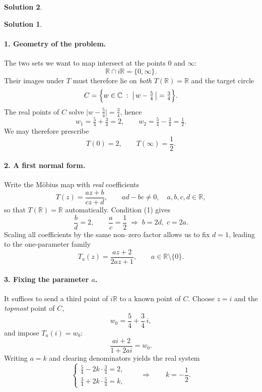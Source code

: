 \documentclass[12pt]{article}
\theoremstyle{definition} %
\newtheorem{solution}{Solution}
\theoremstyle{plain} %
\begin{document}
\begin{solution}
   \begin{solution}
      \paragraph{1.  Geometry of the problem.}
      The two sets we want to map intersect at the points $0$ and $\infty$:
      \[
         \mathbb{R}\cap i\mathbb{R}=\{0,\infty\}.
      \]
      Their images under $T$ must therefore lie on \emph{both}
      $T(\mathbb{R})=\mathbb{R}$ and the target circle
      \[
         C=\Bigl\{w\in\mathbb{C}\;:\;\bigl|\,w-\tfrac54\,\bigr|=\tfrac34\Bigr\}.
      \]
      The real points of $C$ solve 
      $\lvert w-\tfrac54\rvert=\tfrac34$, hence
      \[
         w_1=\tfrac54+\tfrac34=2,
         \qquad
         w_2=\tfrac54-\tfrac34=\tfrac12.
      \]
      We may therefore prescribe
      \[
         T(0)=2,
         \qquad
         T(\infty)=\frac12.
         \tag{1}
      \]
      
      \paragraph{2.  A first normal form.}
      Write the Möbius map with \emph{real} coefficients
      \[
         T(z)=\frac{az+b}{cz+d}, \qquad ad-bc\neq0,\quad a,b,c,d\in\mathbb{R},
      \]
      so that $T(\mathbb{R})=\mathbb{R}$ automatically.
      Condition (1) gives
      \[
         \frac{b}{d}=2,
         \qquad
         \frac{a}{c}=\frac12
         \;\Longrightarrow\;
         b=2d,\;c=2a.
      \]
      Scaling all coefficients by the same non–zero factor allows us to fix $d=1$, leading to the one-parameter family
      \[
         T_a(z)=\frac{az+2}{2az+1},
         \qquad a\in\mathbb{R}\setminus\{0\}.
         \tag{2}
      \]
      
      \paragraph{3.  Fixing the parameter \(a\).}
      It suffices to send a third point of $i\mathbb{R}$ to a known point of $C$.
      Choose $z=i$ and the \emph{topmost} point of $C$,
      \[
         w_0=\frac54+\frac34\,i,
      \]
      and impose $T_a(i)=w_0$:
      \[
         \frac{ai+2}{1+2ai}=w_0.
      \]
      Writing $a=k$ and clearing denominators yields the real system
      \[
         \begin{cases}
            \displaystyle\frac54-2k\cdot\frac34=2,\\[6pt]
            \displaystyle\frac34+2k\cdot\frac54=k,
         \end{cases}
         \qquad\Longrightarrow\qquad
         k=-\dfrac12.
      \]
      

\end{solution}
\end{solution}
\end{document}
